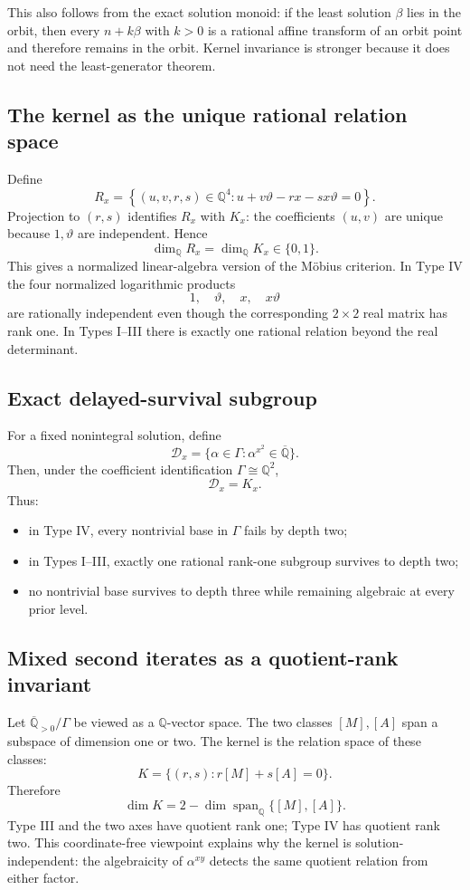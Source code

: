 \documentclass[11pt,oneside]{article}
\theoremstyle{definition}
\theoremstyle{remark}
\newcommand{\Q}{\mathbb Q}
\newcommand{\Qbar}{\overline{\mathbb Q}}
\newcommand{\Apos}{\overline{\mathbb Q}_{>0}}
\newcommand{\Span}{\operatorname{span}}
\begin{document}
This also follows from the exact solution monoid: if the least solution $\beta$ lies in the
orbit, then every $n+k\beta$ with $k>0$ is a rational affine transform of an orbit point and
therefore remains in the orbit.  Kernel invariance is stronger because it does not need the
least-generator theorem.

\subsection{The kernel as the unique rational relation space}

Define
\[
 R_x=\left\{(u,v,r,s)\in\Q^4:
  u+v\vartheta-rx-sx\vartheta=0
 \right\}.
\]
Projection to $(r,s)$ identifies $R_x$ with $K_x$: the coefficients $(u,v)$ are unique because
$1,\vartheta$ are independent.  Hence
\[
 \dim_\Q R_x=\dim_\Q K_x\in\{0,1\}.
\]
This gives a normalized linear-algebra version of the M\"obius criterion.  In Type IV the
four normalized logarithmic products
\[
  1,\quad \vartheta,\quad x,\quad x\vartheta
\]
are rationally independent even though the corresponding $2\times2$ real matrix has rank
one.  In Types I--III there is exactly one rational relation beyond the real determinant.

\subsection{Exact delayed-survival subgroup}

For a fixed nonintegral solution, define
\[
 \mathcal D_x=\{\alpha\in\Gamma:\alpha^{x^2}\in\Qbar\}.
\]
Then, under the coefficient identification $\Gamma\cong\Q^2$,
\[
  \mathcal D_x=K_x.
\]
Thus:

\begin{itemize}
\item in Type IV, every nontrivial base in $\Gamma$ fails by depth two;
\item in Types I--III, exactly one rational rank-one subgroup survives to depth two;
\item no nontrivial base survives to depth three while remaining algebraic at every prior
      level.
\end{itemize}

\subsection{Mixed second iterates as a quotient-rank invariant}

Let $\Apos/\Gamma$ be viewed as a $\Q$-vector space.  The two classes $[M],[A]$ span a
subspace of dimension one or two.  The kernel is the relation space of these classes:
\[
 K=\{(r,s):r[M]+s[A]=0\}.
\]
Therefore
\[
 \dim K=2-\dim\Span_\Q\{[M],[A]\}.
\]
Type III and the two axes have quotient rank one; Type IV has quotient rank two.  This
coordinate-free viewpoint explains why the kernel is solution-independent: the algebraicity
of $\alpha^{xy}$ detects the same quotient relation from either factor.
\end{document}
